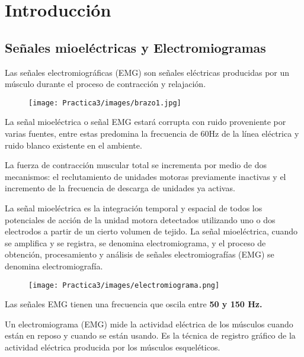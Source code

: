 \documentclass[12pt]{article}
\begin{document}

	\section{Introducción}
	\subsection{Señales mioeléctricas y Electromiogramas}
	Las señales electromiográficas (EMG) son señales eléctricas producidas por un músculo durante el proceso de contracción y relajación.
	
	        \begin{figure}[h!]
                \centering
                \texttt{[image: Practica3/images/brazo1.jpg]}
            \end{figure} 
	
	La señal mioeléctrica o señal EMG estará corrupta con ruido proveniente por varias fuentes, entre estas predomina la frecuencia de 60Hz de la línea eléctrica y ruido blanco existente en el ambiente. 
	
	La fuerza de contracción muscular total se incrementa por medio de dos mecanismos: el reclutamiento de unidades motoras previamente inactivas y el incremento de la frecuencia de descarga de unidades ya activas. 
	
	La señal mioeléctrica es la integración temporal y espacial de todos los potenciales de acción de la unidad motora detectados utilizando uno o dos electrodos a partir de un cierto volumen de tejido. La señal mioeléctrica, cuando se amplifica y se registra, se denomina electromiograma, y el proceso de obtención, procesamiento y análisis de señales electromiografías (EMG) se denomina electromiografía. 
	
		\begin{figure}[h!]
                \centering
                \texttt{[image: Practica3/images/electromiograma.png]}
    \end{figure} 
	
	Las señales EMG tienen una frecuencia que oscila entre \textbf{50 y 150 Hz.}

	Un electromiograma (EMG) mide la actividad eléctrica de los músculos cuando están en reposo y cuando se están usando. Es la técnica de registro gráfico de la actividad eléctrica producida por los músculos esqueléticos. 
	
\end{document}
